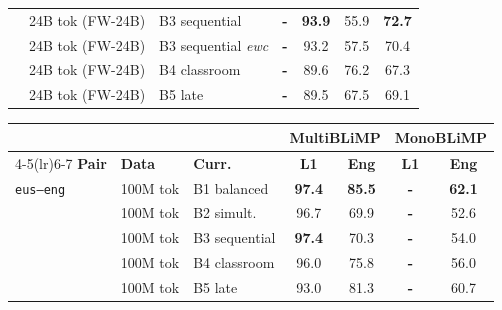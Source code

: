 \begin{table}[t]
\begin{minipage}[t]{0.49\linewidth}
\begin{tabular}{ll l cc cc}
 & 24B tok (FW-24B) & B3 sequential & \textbf{-} & \cellcolor[rgb]{0.762,1.000,0.762} \textbf{93.9} & \cellcolor[rgb]{1.000,0.965,0.965} 55.9 & \cellcolor[rgb]{0.831,1.000,0.831} \textbf{72.7} \\
 & 24B tok (FW-24B) & B3 sequential {\scriptsize\textit{ewc}} & \textbf{-} & \cellcolor[rgb]{0.765,1.000,0.765} 93.2 & \cellcolor[rgb]{0.988,1.000,0.988} 57.5 & \cellcolor[rgb]{0.843,1.000,0.843} 70.4 \\
 & 24B tok (FW-24B) & B4 classroom & \textbf{-} & \cellcolor[rgb]{0.784,1.000,0.784} 89.6 & \cellcolor[rgb]{0.824,1.000,0.824} 76.2 & \cellcolor[rgb]{0.865,1.000,0.865} 67.3 \\
 & 24B tok (FW-24B) & B5 late & \textbf{-} & \cellcolor[rgb]{0.785,1.000,0.785} 89.5 & \cellcolor[rgb]{0.892,1.000,0.892} 67.5 & \cellcolor[rgb]{0.852,1.000,0.852} 69.1 \\
\bottomrule
\end{tabular}
\end{minipage}\hfill
\begin{minipage}[t]{0.49\linewidth}\centering
\begin{tabular}{ll l cc cc}
\toprule
& & & \multicolumn{2}{c}{\textbf{MultiBLiMP}} & \multicolumn{2}{c}{\textbf{MonoBLiMP}} \\
\cmidrule(lr){4-5}\cmidrule(lr){6-7}
\textbf{Pair} & \textbf{Data} & \textbf{Curr.} & \textbf{L1} & \textbf{Eng} & \textbf{L1} & \textbf{Eng} \\
\midrule
\texttt{eus--eng} & 100M tok & B1 balanced & \cellcolor[rgb]{0.738,1.000,0.738} \textbf{97.4} & \cellcolor[rgb]{0.806,1.000,0.806} \textbf{85.5} & \textbf{-} & \cellcolor[rgb]{0.900,1.000,0.900} \textbf{62.1} \\
 & 100M tok & B2 simult. & \cellcolor[rgb]{0.742,1.000,0.742} 96.7 & \cellcolor[rgb]{0.891,1.000,0.891} 69.9 & \textbf{-} & \cellcolor[rgb]{0.979,1.000,0.979} 52.6 \\
 & 100M tok & B3 sequential & \cellcolor[rgb]{0.738,1.000,0.738} \textbf{97.4} & \cellcolor[rgb]{0.889,1.000,0.889} 70.3 & \textbf{-} & \cellcolor[rgb]{0.967,1.000,0.967} 54.0 \\
 & 100M tok & B4 classroom & \cellcolor[rgb]{0.745,1.000,0.745} 96.0 & \cellcolor[rgb]{0.859,1.000,0.859} 75.8 & \textbf{-} & \cellcolor[rgb]{0.951,1.000,0.951} 56.0 \\
 & 100M tok & B5 late & \cellcolor[rgb]{0.762,1.000,0.762} 93.0 & \cellcolor[rgb]{0.829,1.000,0.829} 81.3 & \textbf{-} & \cellcolor[rgb]{0.912,1.000,0.912} 60.7 \\

\end{tabular}
\end{minipage}
\end{table}

